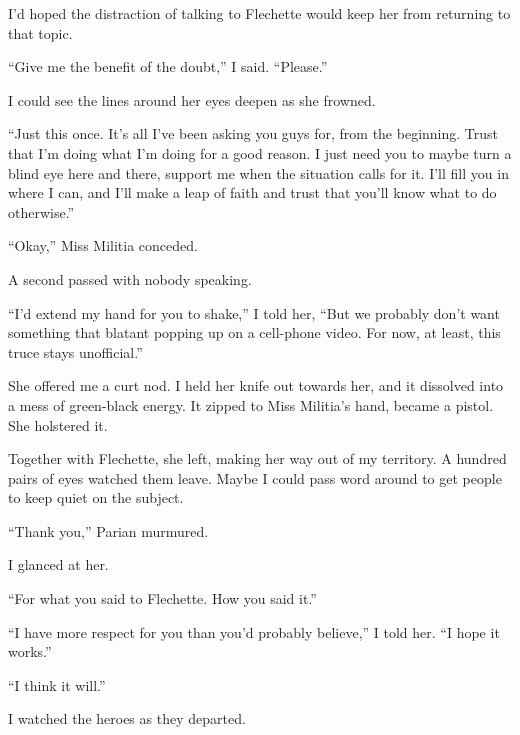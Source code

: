 I'd hoped the distraction of talking to Flechette would keep her from returning to that topic.



``Give me the benefit of the doubt,'' I said.  ``Please.''



I could see the lines around her eyes deepen as she frowned.



``Just this once.  It's all I've been asking you guys for, from the beginning.  Trust that I'm doing what I'm doing for a good reason.  I just need you to maybe turn a blind eye here and there, support me when the situation calls for it.  I'll fill you in where I can, and I'll make a leap of faith and trust that you'll know what to do otherwise.''



``Okay,'' Miss Militia conceded.



A second passed with nobody speaking.



``I'd extend my hand for you to shake,'' I told her, ``But we probably don't want something that blatant popping up on a cell-phone video.  For now, at least, this truce stays unofficial.''



She offered me a curt nod.  I held her knife out towards her, and it dissolved into a mess of green-black energy.  It zipped to Miss Militia's hand, became a pistol.  She holstered it.



Together with Flechette, she left, making her way out of my territory.  A hundred pairs of eyes watched them leave.  Maybe I could pass word around to get people to keep quiet on the subject.



``Thank you,'' Parian murmured.



I glanced at her.



``For what you said to Flechette.  How you said it.''



``I have more respect for you than you'd probably believe,'' I told her.  ``I hope it works.''



``I think it will.''



I watched the heroes as they departed.



